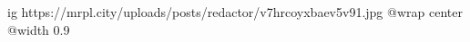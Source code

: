  
 
 
 
 

\ifcmt
  ig https://mrpl.city/uploads/posts/redactor/v7hrcoyxbaev5v91.jpg
  @wrap center
  @width 0.9
\fi

